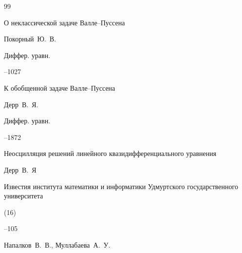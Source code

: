 \begin{thebibliography}{99}




\paper О неклассической задаче Валле--Пуссена

\by Покорный~Ю.~В.

\jour Диффер. уравн.




--1027









\paper К обобщенной задаче Валле--Пуссена

\by Дерр~В.~Я.

\jour Диффер. уравн.




--1872









\paper Неосцилляция решений линейного квазидифференциального уравнения

\by Дерр~В.~Я

\jour Известия института математики и информатики Удмуртского государственного университета


(16)

--105




\by Напалков~В.~В., Муллабаева~А.~У.


\end{thebibliography}
